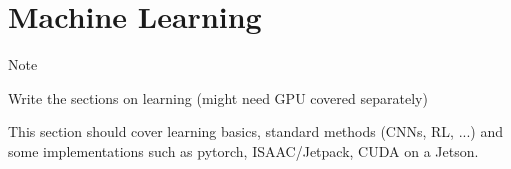 \hypertarget{machine-learning}{%
\section{Machine Learning}\label{machine-learning}}

Note

Write the sections on learning (might need GPU covered separately)

This section should cover learning basics, standard methods (CNNs, RL,
...) and some implementations such as pytorch, ISAAC/Jetpack, CUDA on a
Jetson.
